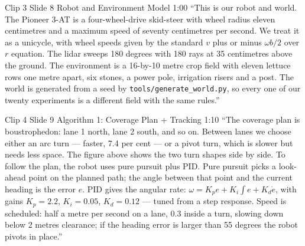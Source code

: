 \documentclass[11pt,a4paper]{article}
\begin{document}
\begin{clipbox}{Clip 3 \textbullet{} Slide 8 Robot and Environment Model \textbullet{} 1:00}
``This is our robot and world. The Pioneer 3-AT is a four-wheel-drive skid-steer with wheel radius eleven centimetres and a maximum speed of seventy centimetres per second. We treat it as a unicycle, with wheel speeds given by the standard $v$ plus or minus $\omega b / 2$ over $r$ equation. The lidar sweeps 180 degrees with 180 rays at 35 centimetres above the ground. The environment is a 16-by-10 metre crop field with eleven lettuce rows one metre apart, six stones, a power pole, irrigation risers and a post. The world is generated from a seed by \texttt{tools/generate\_world.py}, so every one of our twenty experiments is a different field with the same rules.''
\end{clipbox}

\begin{clipbox}{Clip 4 \textbullet{} Slide 9 Algorithm 1: Coverage Plan + Tracking \textbullet{} 1:10}
``The coverage plan is boustrophedon: lane 1 north, lane 2 south, and so on. Between lanes we choose either an arc turn --- faster, 7.4 per cent --- or a pivot turn, which is slower but needs less space. The figure above shows the two turn shapes side by side. To follow the plan, the robot uses pure pursuit plus PID. Pure pursuit picks a look-ahead point on the planned path; the angle between that point and the current heading is the error $e$. PID gives the angular rate: $\omega = K_p e + K_i \int e + K_d \dot{e}$, with gains $K_p = 2.2$, $K_i = 0.05$, $K_d = 0.12$ --- tuned from a step response. Speed is scheduled: half a metre per second on a lane, 0.3 inside a turn, slowing down below 2 metres clearance; if the heading error is larger than 55 degrees the robot pivots in place.''
\end{clipbox}
\end{document}
